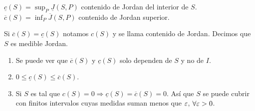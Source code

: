\begin{definition}
  \(\underline{c}(S) = \sup_P \underline{J}(S, P)\) contenido de Jordan del interior de \(S\).
  \(\overline{c}(S) = \inf_P \overline{J}(S, P)\) contenido de Jordan superior.
\end{definition}

\begin{definition}
  Si \(\overline{c}(S) = \underline{c}(S)\) notamos \(c(S)\) y se llama contenido de Jordan. Decimos que \(S\) es medible Jordan.
\end{definition}

\begin{note}
  \begin{enumerate}
    \item Se puede ver que \(\overline{c}(S)\) y \(\underline{c}(S)\) solo dependen de \(S\) y no de \(I\).
    \item \(0 \leq \underline{c}(S) \leq \overline{c}(S)\).
    \item Si \(S\) es tal que \(c(S) = 0 \Rightarrow \underline{c}(S) = \overline{c}(S) = 0\). Así que \(S\) se puede cubrir con finitos intervalos cuyas medidas suman menos que \(\varepsilon \), \(\forall \varepsilon > 0\).
  \end{enumerate}
\end{note}
